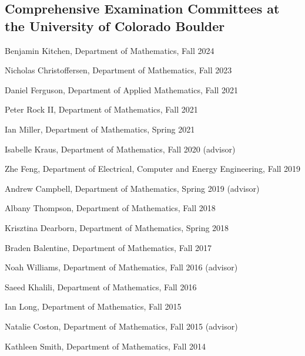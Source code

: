 \documentclass[letterpaper]{article}
\renewenvironment{itemize}{
  \begin{list}{}{
    \setlength{\leftmargin}{1em}
  }
}{
  \end{list}
}
\begin{document}
\subsection*{Comprehensive Examination Committees at the University of Colorado Boulder} 
\begin{itemize}
	\item Benjamin Kitchen, Department of Mathematics, Fall 2024
	\item Nicholas Christoffersen, Department of Mathematics, Fall 2023
	\item Daniel Ferguson, Department of Applied Mathematics, Fall 2021
	\item Peter Rock II, Department of Mathematics, Fall 2021
	\item Ian Miller, Department of Mathematics, Spring 2021
	\item Isabelle Kraus, Department of Mathematics, Fall 2020 (advisor)
	\item Zhe Feng, Department of Electrical, Computer and Energy Engineering, Fall 2019  
	\item Andrew Campbell, Department of Mathematics, Spring 2019 (advisor) 
	\item Albany Thompson, Department of Mathematics, Fall 2018 
	\item Krisztina Dearborn, Department of Mathematics, Spring 2018 
	\item Braden Balentine, Department of Mathematics, Fall 2017 
	\item Noah Williams, Department of Mathematics, Fall 2016 (advisor) 
	\item Saeed Khalili, Department of Mathematics, Fall 2016 
	\item Ian Long, Department of Mathematics, Fall 2015 
	\item Natalie Coston, Department of Mathematics, Fall 2015 (advisor)
	\item Kathleen Smith, Department of Mathematics, Fall 2014

\end{itemize}
\end{document}
